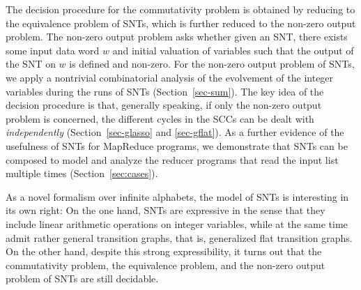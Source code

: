 The decision procedure for the commutativity problem is obtained by reducing to the equivalence problem of SNTs, which is further reduced to the non-zero output problem. The non-zero output problem asks whether given an SNT, there exists some input data word $w$ and initial valuation of variables such that the output of the SNT on $w$ is defined and non-zero.  For the non-zero output problem of SNTs, we apply a nontrivial combinatorial analysis of the evolvement of the integer variables during the runs of SNTs (Section~\ref{sec-sum}). The key idea of the decision procedure is that, generally speaking, if only the non-zero output problem is concerned, the different cycles in the SCCs can be dealt with \emph{independently} (Section~\ref{sec-glasso} and \ref{sec-gflat}). 
%
As a further evidence of the usefulness of SNTs for MapReduce programs, we demonstrate that SNTs can be composed to model and analyze the reducer programs that read the input list multiple times (Section~\ref{sec:cases}). 

As a novel formalism over infinite alphabets, the model of SNTs is interesting in its own right: On the one hand, SNTs are expressive in the sense that they include linear arithmetic operations on integer variables, while at the same time admit rather general transition graphs, that is, generalized flat transition graphs. On the other hand, despite this strong expressibility, it turns out that the commutativity problem, the equivalence problem, and the non-zero output problem of SNTs are still decidable.  

\smallskip

